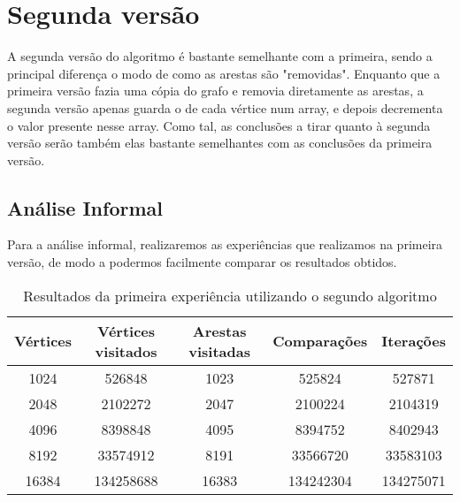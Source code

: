 \chapter{Segunda versão}

A segunda versão do algoritmo é bastante semelhante com a primeira, sendo a
principal diferença o modo de como as arestas são "removidas". Enquanto que a
primeira versão fazia uma cópia do grafo e removia diretamente as arestas, a
segunda versão apenas guarda o  de cada vértice num array, e
depois decrementa o valor presente nesse array. Como tal, as conclusões a tirar
quanto à segunda versão serão também elas bastante semelhantes com as conclusões
da primeira versão.


\section{Análise Informal}
Para a análise informal, realizaremos as experiências
que realizamos na primeira versão, de modo a podermos
facilmente comparar os resultados obtidos.

\begin{table}[H]
	\centering
	\begin{tabular}{| c || c | c | c | c |}
		\hline
		Vértices & Vértices visitados & Arestas visitadas & Comparações & Iterações \\
		\hline\hline
		1024     & 526848             & 1023              & 525824      & 527871    \\
		2048     & 2102272            & 2047              & 2100224     & 2104319   \\
		4096     & 8398848            & 4095              & 8394752     & 8402943   \\
		8192     & 33574912           & 8191              & 33566720    & 33583103  \\
		16384    & 134258688          & 16383             & 134242304   & 134275071 \\
		\hline
	\end{tabular}
	\caption{Resultados da primeira experiência utilizando o segundo algoritmo}
	\label{2-1}
\end{table}

